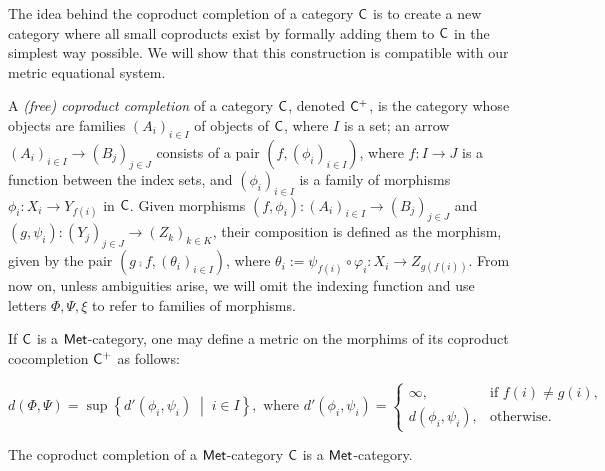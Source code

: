The idea behind the coproduct completion of a category $\mathsf{C}$ is to create a new category where all small coproducts exist by formally adding them to $\mathsf{C}$  in the simplest way possible. We will show that this construction is compatible with our metric equational system.

\begin{definition}
  A \emph{(free) coproduct completion} of a category \(\mathsf{C}\), denoted $\mathsf{C}^+$, is the category whose objects are families \((A_i)_{i \in I}\) of objects of \(\mathsf{C}\), where \(I\) is a set; an arrow \((A_i)_{i \in I} \to (B_j)_{j \in J}\) consists of a pair \((f, (\phi_i)_{i \in I})\), where \(f : I \to J\) is a function between the index sets, and \((\phi_i)_{i \in I}\) is a family of morphisms \(\phi_i : X_i \to Y_{f(i)}\) in \(\mathsf{C}\). Given morphisms $(f,\phi_i): (A_i)_{i \in I} \to (B_j)_{j \in J}$ and $(g,\psi_i): (Y_j)_{j \in J} \to (Z_k)_{k \in K}$, their composition is defined as the morphism, given by the pair \((g \comp f, (\theta_i)_{i \in I})\), where $ \theta_i := \psi_{f(i)} \circ \varphi_i : X_i \to Z_{g(f(i))}$. From now on, unless ambiguities arise, we will omit the indexing function and use letters $\Phi, \Psi, \xi$ to refer to families of morphisms.
\end{definition}


If $\mathsf{C}$ is a $\mathsf{Met}$-category, one may define a metric on the morphims of its coproduct cocompletion $\mathsf{C}^+$ as follows:

\begin{equation*}
  d(\Phi, \Psi) = \sup \left\{ d'(\phi_i, \psi_i) \;\middle\vert\; i \in I \right\},\text{ where } 
  d'(\phi_i, \psi_i) 
  = 
  \begin{cases}
    \infty, & \text{if } f(i) \neq g(i), \\
    d(\phi_i, \psi_i), & \text{otherwise}.
  \end{cases}
\end{equation*}

\begin{proposition} \label{prop:cop_completion_met}
  The coproduct completion of a $\mathsf{Met}$-category $\mathsf{C}$ is a $\mathsf{Met}$-category.
\end{proposition}

